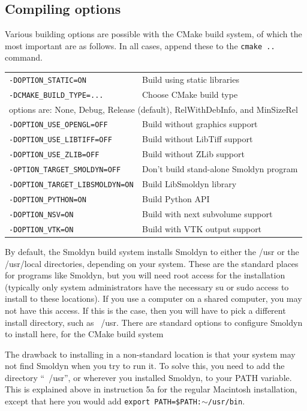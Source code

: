 \documentclass {scrbook}
\newcommand {\ttt} {\texttt}
\begin{document}
\subsection*{Compiling options}

Various building options are possible with the CMake build system, of which the most important are as follows. In all cases, append these to the \ttt{cmake ..} command.

\begin{longtable}[c]{ll}
\ttt{-DOPTION\_STATIC=ON} & Build using static libraries\\
\ttt{-DCMAKE\_BUILD\_TYPE=...} & Choose CMake build type\\
\multicolumn{2}{l}{options are: None, Debug, Release (default), RelWithDebInfo, and MinSizeRel}\\
\ttt{-DOPTION\_USE\_OPENGL=OFF} & Build without graphics support\\
\ttt{-DOPTION\_USE\_LIBTIFF=OFF} & Build without LibTiff support\\
\ttt{-DOPTION\_USE\_ZLIB=OFF} & Build without ZLib support\\
\ttt{-OPTION\_TARGET\_SMOLDYN=OFF} & Don't build stand-alone Smoldyn program\\
\ttt{-DOPTION\_TARGET\_LIBSMOLDYN=ON} & Build LibSmoldyn library\\
\ttt{-DOPTION\_PYTHON=ON} & Build Python API\\
\ttt{-DOPTION\_NSV=ON} & Build with next subvolume support\\
\ttt{-DOPTION\_VTK=ON} & Build with VTK output support\\
\end{longtable}

By default, the Smoldyn build system installs Smoldyn to either the /usr or the /usr/local directories, depending on your system. These are the standard places for programs like Smoldyn, but you will need root access for the installation (typically only system administrators have the necessary su or sudo access to install to these locations). If you use a computer on a shared computer, you may not have this access. If this is the case, then you will have to pick a different install directory, such as ~/usr. There are standard options to configure Smoldyn to install here, for the CMake build system

The drawback to installing in a non-standard location is that your system may not find Smoldyn when you try to run it. To solve this, you need to add the directory ``~/usr'', or wherever you installed Smoldyn, to your PATH variable. This is explained above in instruction 5a for the regular Macintosh installation, except that here you would add \ttt{export PATH=\$PATH:$\sim$/usr/bin}.
\end{document}

